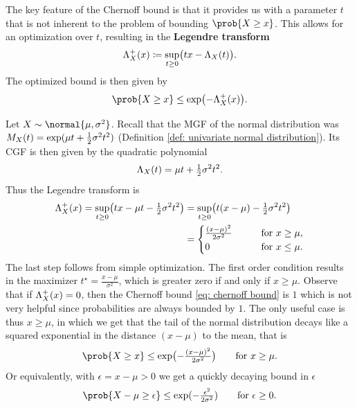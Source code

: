 The key feature of the Chernoff bound is that it provides us with a parameter \(t\)
that is not inherent to the problem of bounding \(\prob{X \ge x}\). This allows for
an optimization over \(t\), resulting in the \textbf{Legendre transform}
\[
    \Lambda^+_X(x) \coloneq \sup_{t\ge 0} \bigl( t x - \Lambda_X(t) \bigr).
\]
The optimized bound is then given by
\begin{equation}
    \label{eq: chernoff bound}    
    \prob{X \ge x} \le \exp\bigl(-\CGF^+_X(x)\bigr).
\end{equation}

\begin{example}
    \label{ex: chernoff bound for normal distribution}
    Let \(X \sim \normal{\mu, \sigma^2}\). 
    Recall that the MGF of the normal distribution was
    \(M_X(t) = \exp(\mu t + \frac12 \sigma^2 t^2)\) (Definition \ref{def:
    univariate normal distribution}). Its CGF is then given by the quadratic
    polynomial
    \[
        \Lambda_X(t) = \mu t + \tfrac12 \sigma^2 t^2.
    \]
    Thus the Legendre transform is
    \[\begin{aligned}
        \Lambda_X^+(x)
        = \sup_{t\ge 0} \bigl(t x - \mu t - \tfrac12 \sigma^2 t^2\bigr)
        &= \sup_{t\ge 0} \bigl(t (x - \mu) - \tfrac12 \sigma^2 t^2\bigr)
        \\
        &= \begin{cases}
        \frac{(x - \mu)^2}{2\sigma^2}
        \qquad &\text{for } x \ge \mu,
        \\
        0 &\text{for } x \le \mu.
        \end{cases}
    \end{aligned}\]
    The last step follows from simple optimization. The first order condition
    results in the maximizer \(t^\star = \frac{x - \mu}{\sigma^2}\), which is greater
    zero if and only if \(x \ge \mu\).
    Observe that if \(\Lambda_X^+(x) = 0\), then the Chernoff bound \eqref{eq: chernoff bound}
    is \(1\) which is not very helpful since probabilities are always bounded by \(1\).
    The only useful case is thus \(x \ge \mu\), in which we get that
    the tail of the normal distribution decays like a squared exponential in the
    distance \((x-\mu)\) to the mean, that is
    \[
        \prob{X \ge x}
        \le \exp\bigl(- \tfrac{(x - \mu)^2}{2\sigma^2}\bigr)
        \qquad\text{for } x \ge \mu.
    \]
    Or equivalently, with \(\epsilon = x - \mu > 0\) we get a quickly decaying bound in \(\epsilon\)
    \[
        \prob{X - \mu \ge \epsilon}
        \le \exp(-\tfrac{\epsilon^2}{2\sigma^2})
        \qquad\text{for } \epsilon \ge 0.
    \]
\end{example}

